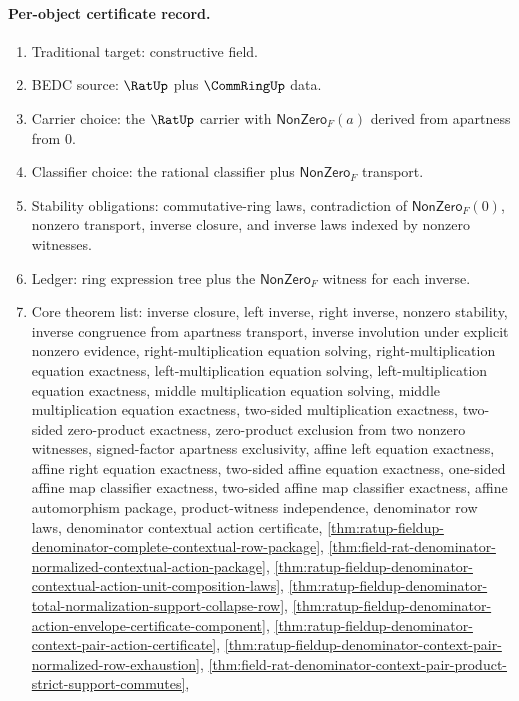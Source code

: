 \paragraph{Per-object certificate record.}
\begin{enumerate}
  \item Traditional target: constructive field.
  \item BEDC source: $\RatUp$ plus $\CommRingUp$ data.
  \item Carrier choice: the $\RatUp$ carrier with $\mathsf{NonZero}_F(a)$ derived from apartness from $0$.
  \item Classifier choice: the rational classifier plus $\mathsf{NonZero}_F$ transport.
  \item Stability obligations: commutative-ring laws, contradiction of $\mathsf{NonZero}_F(0)$, nonzero transport, inverse closure, and inverse laws indexed by nonzero witnesses.
  \item Ledger: ring expression tree plus the $\mathsf{NonZero}_F$ witness for each inverse.
  \item Core theorem list: inverse closure, left inverse, right inverse, nonzero
  stability, inverse congruence from apartness transport, inverse involution under
  explicit nonzero evidence, right-multiplication equation solving,
  right-multiplication equation exactness, left-multiplication equation solving,
  left-multiplication equation exactness, middle multiplication equation solving,
  middle multiplication equation exactness, two-sided multiplication exactness,
  two-sided zero-product exactness, zero-product exclusion from two nonzero
  witnesses, signed-factor apartness exclusivity, affine left equation exactness,
  affine right equation exactness, two-sided affine equation exactness,
  one-sided affine map classifier exactness, two-sided affine map classifier
  exactness, affine automorphism package, product-witness independence,
  denominator row laws, denominator contextual action certificate,
  \autoref{thm:ratup-fieldup-denominator-complete-contextual-row-package},
  \autoref{thm:field-rat-denominator-normalized-contextual-action-package},
  \autoref{thm:ratup-fieldup-denominator-contextual-action-unit-composition-laws},
  \autoref{thm:ratup-fieldup-denominator-total-normalization-support-collapse-row},
  \autoref{thm:ratup-fieldup-denominator-action-envelope-certificate-component},
  \autoref{thm:ratup-fieldup-denominator-context-pair-action-certificate},
  \autoref{thm:ratup-fieldup-denominator-context-pair-normalized-row-exhaustion},
  \autoref{thm:field-rat-denominator-context-pair-product-strict-support-commutes},

\end{enumerate}
